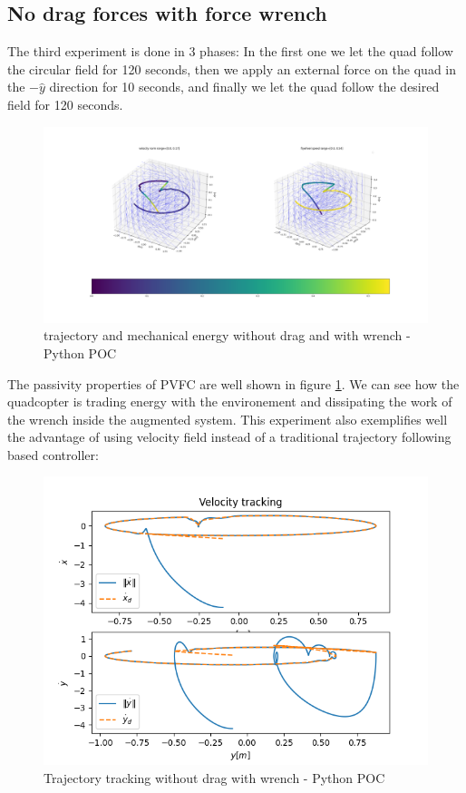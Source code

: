 \subsection{No drag forces with force wrench}
The third experiment is done in 3 phases: In the first one we let the quad follow the circular field for 120 seconds, 
then we apply an external force on the quad in the $-\hat{y}$ direction for 10 seconds,
and finally we let the quad follow the desired field for 120 seconds.
\begin{figure}[h!]
   \centering
   \includegraphics[width=\linewidth]{Images/python-nodrag-wrench.png}
   \caption{trajectory and mechanical energy without drag and with wrench - Python POC }
   \label{fig:pythonnodragwrench}
\end{figure}
The passivity properties of PVFC are well shown in figure \ref{fig:pythonnodragwrench}. We can see how the quadcopter is trading energy with the environement and dissipating the work of the wrench inside the augmented system.
This experiment also exemplifies well the advantage of using velocity field instead of a traditional trajectory following based controller:
\begin{figure}[h!]
   \centering
   \includegraphics[width=\linewidth]{Images/velocitytrackingpythonnodragwrench.png}
   \caption{Trajectory tracking without drag with wrench - Python POC }
   \label{fig:trajtracknodragwrench}
\end{figure}
